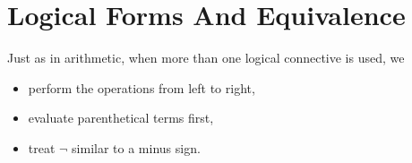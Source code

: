 \guard

\section{Logical Forms And Equivalence}
\label{sec:logicalFormsAndEquivalence}





Just as in arithmetic, when more than one logical connective is used, we
\begin{itemize}
  \item perform the operations from left to right,
  \item evaluate parenthetical terms first,
  \item treat $\neg$ similar to a minus sign.
\end{itemize}





















